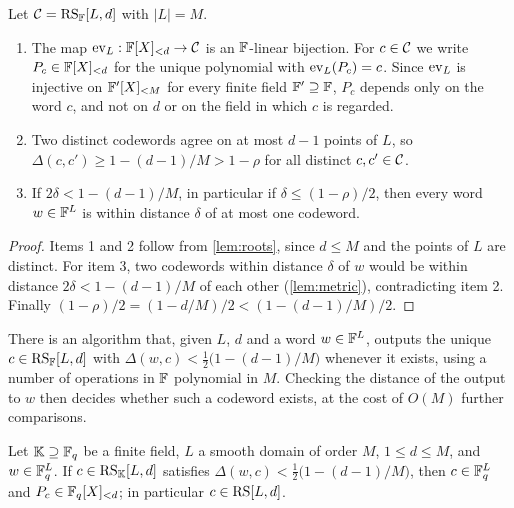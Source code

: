 \begin{lemma}\label{lem:rs-params}
Let $\mathcal{C} = \mathrm{RS}_{\mathbb{F}}[L,d]$ with $|L| = M$.
\begin{enumerate}
  \item The map $\mathrm{ev}_L : \mathbb{F}[X]_{<d} \to \mathcal{C}$ is an $\mathbb{F}$-linear bijection. For $c \in \mathcal{C}$ we write $P_c \in \mathbb{F}[X]_{<d}$ for the unique polynomial with $\mathrm{ev}_L(P_c) = c$.
Since $\mathrm{ev}_L$ is injective on $\mathbb{F}'[X]_{<M}$ for every finite field $\mathbb{F}' \supseteq \mathbb{F}$, $P_c$ depends only on the word $c$, and not on $d$ or on the field in which $c$ is regarded.
  \item Two distinct codewords agree on at most $d-1$ points of $L$, so $\Delta(c,c') \ge 1 - (d-1)/M > 1 - \rho$ for all distinct $c, c' \in \mathcal{C}$.
  \item If $2\delta < 1 - (d-1)/M$, in particular if $\delta \le (1-\rho)/2$, then every word $w \in \mathbb{F}^L$ is within distance $\delta$ of at most one codeword.
\end{enumerate}
\end{lemma}

\begin{proof}
Items 1 and 2 follow from \cref{lem:roots}, since $d \le M$ and the points of $L$ are distinct. For item 3, two codewords within distance $\delta$ of $w$ would be within distance $2\delta < 1 - (d-1)/M$ of each other (\cref{lem:metric}), contradicting item 2. Finally $(1-\rho)/2 = (1 - d/M)/2 < (1 - (d-1)/M)/2$.
\end{proof}

\begin{fact}\label{fact:decode}
There is an algorithm that, given $L$, $d$ and a word $w \in \mathbb{F}^L$, outputs the unique $c \in \mathrm{RS}_{\mathbb{F}}[L,d]$ with $\Delta(w,c) < \tfrac12\bigl(1 - (d-1)/M\bigr)$ whenever it exists, using a number of operations in $\mathbb{F}$ polynomial in $M$.
Checking the distance of the output to $w$ then decides whether such a codeword exists, at the cost of $O(M)$ further comparisons.
\end{fact}

\begin{lemma}\label{lem:descent}
Let $\mathbb{K} \supseteq \mathbb{F}_q$ be a finite field, $L$ a smooth domain of order $M$, $1 \le d \le M$, and $w \in \mathbb{F}_q^L$.
If $c \in \mathrm{RS}_{\mathbb{K}}[L,d]$ satisfies $\Delta(w,c) < \tfrac12\bigl(1 - (d-1)/M\bigr)$, then $c \in \mathbb{F}_q^L$ and $P_c \in \mathbb{F}_q[X]_{<d}$; in particular $c \in \mathrm{RS}[L,d]$.
\end{lemma}

